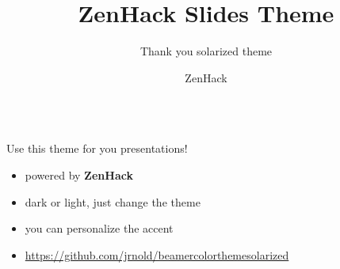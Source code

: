 \documentclass[xcolor=dvipsnames,aspectratio=169]{beamer}
\title{ZenHack Slides Theme}
\author{ZenHack}
\subtitle{Thank you solarized theme}
\begin{document}
\begin{frame}[plain]
\maketitle
\begin{columns}
	
\end{columns}
\end{frame}

\begin{frame}
\begin{theorem}
Use this theme for you presentations!
\end{theorem}

\begin{itemize}[<+->]
	\item powered by \textbf{ZenHack}
	\item dark or light, just change the theme
	\item you can personalize the accent
	\item \url{https://github.com/jrnold/beamercolorthemesolarized}
\end{itemize}
\end{frame}
\end{document}
